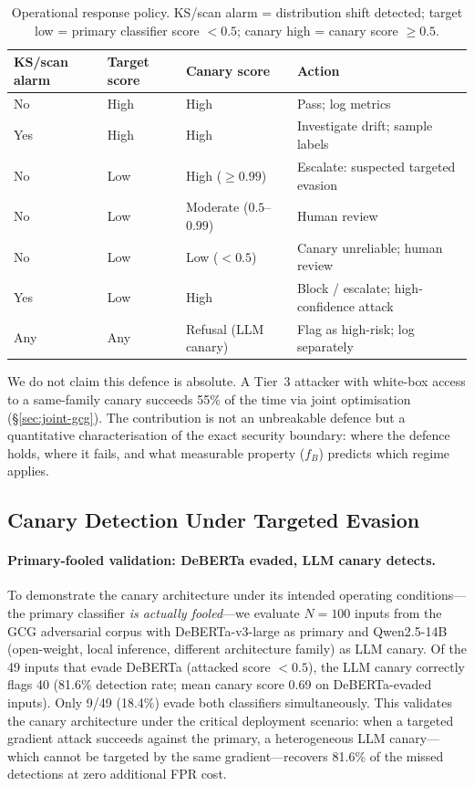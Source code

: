 \begin{table}[h]
\centering
\small
\caption{Operational response policy. KS/scan alarm = distribution shift detected; target low = primary classifier score $< 0.5$; canary high = canary score $\geq 0.5$.}
\label{tab:ops}
\begin{tabular}{llll}
\toprule
\textbf{KS/scan alarm} & \textbf{Target score} & \textbf{Canary score} & \textbf{Action} \\
\midrule
No  & High & High & Pass; log metrics \\
Yes & High & High & Investigate drift; sample labels \\
No  & Low  & High ($\geq 0.99$) & Escalate: suspected targeted evasion \\
No  & Low  & Moderate ($0.5$--$0.99$) & Human review \\
No  & Low  & Low ($< 0.5$) & Canary unreliable; human review \\
Yes & Low  & High & Block / escalate; high-confidence attack \\
Any & Any  & Refusal (LLM canary) & Flag as high-risk; log separately \\
\bottomrule
\end{tabular}
\end{table}

We do not claim this defence is absolute. A Tier~3 attacker with white-box access to a same-family canary succeeds 55\% of the time via joint optimisation (\S\ref{sec:joint-gcg}). The contribution is not an unbreakable defence but a quantitative characterisation of the exact security boundary: where the defence holds, where it fails, and what measurable property ($f_B$) predicts which regime applies.




\subsection{Canary Detection Under Targeted Evasion}
\label{sec:deployment-casestudy}

\paragraph{Primary-fooled validation: DeBERTa evaded, LLM canary detects.} To demonstrate the canary architecture under its intended operating conditions---the primary classifier \emph{is actually fooled}---we evaluate $N{=}100$ inputs from the GCG adversarial corpus with DeBERTa-v3-large as primary and Qwen2.5-14B (open-weight, local inference, different architecture family) as LLM canary. Of the 49 inputs that evade DeBERTa (attacked score $< 0.5$), the LLM canary correctly flags 40 (81.6\% detection rate; mean canary score 0.69 on DeBERTa-evaded inputs). Only 9/49 (18.4\%) evade both classifiers simultaneously. This validates the canary architecture under the critical deployment scenario: when a targeted gradient attack succeeds against the primary, a heterogeneous LLM canary---which cannot be targeted by the same gradient---recovers 81.6\% of the missed detections at zero additional FPR cost.

